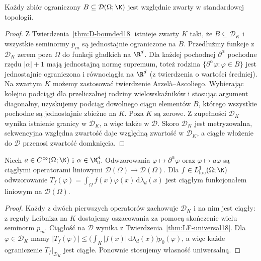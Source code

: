 \begin{twierdzenie}
\label{thm:D-Montel18}
Każdy zbiór ograniczony $B\subseteq\mathcal D(\Omega;\K)$
jest względnie zwarty w standardowej topologii.
\end{twierdzenie}
\begin{proof}
Z Twierdzenia~\ref{thm:D-bounded18} istnieje zwarty $K$
taki, że $B\subseteq\mathcal D_K$ i wszystkie seminormy
$p_m$ są jednostajnie ograniczone na $B$.
Przedłużmy funkcje z $\mathcal D_K$ zerem poza $\Omega$
do funkcji gładkich na $\R^d$. Dla każdej pochodnej
$\partial^\alpha$ pochodne rzędu $|\alpha|+1$ mają
jednostajną normę supremum, toteż rodzina
$\{\partial^\alpha\varphi:\varphi\in B\}$ jest
jednostajnie ograniczona i równociągła na $\R^d$
(z twierdzenia o wartości średniej). Na zwartym $K$
możemy zastosować twierdzenie Arzel\`a--Ascoliego.
Wybierając kolejno podciągi dla przeliczalnej rodziny
wielowskaźników i stosując argument diagonalny,
uzyskujemy podciąg dowolnego ciągu elementów $B$,
którego wszystkie pochodne są jednostajnie zbieżne na $K$.
Poza $K$ są zerowe. Z zupełności $\mathcal D_K$
wynika istnienie granicy w $\mathcal D_K$, a więc także
w $\mathcal D$. Skoro $\mathcal D_K$ jest metryzowalna,
sekwencyjna względna zwartość daje względną zwartość
w $\mathcal D_K$, a ciągłe włożenie do $\mathcal D$
przenosi zwartość domknięcia.
\end{proof}

\begin{stwierdzenie}
\label{prop:D-operators18}
Niech $a\in C^\infty(\Omega;\K)$ i
$\alpha\in\N_0^d$. Odwzorowania
$\varphi\mapsto\partial^\alpha\varphi$ oraz
$\varphi\mapsto a\varphi$ są ciągłymi operatorami
liniowymi $\mathcal D(\Omega)\to\mathcal D(\Omega)$.
Dla $f\in L^1_{\mathrm{loc}}(\Omega;\K)$ odwzorowanie
$T_f(\varphi)=\int_\Omega f(x)\varphi(x)\,\mathrm d\lambda_d(x)$
jest ciągłym funkcjonałem liniowym na $\mathcal D(\Omega)$.
\end{stwierdzenie}
\begin{proof}
Każdy z dwóch pierwszych operatorów zachowuje
$\mathcal D_K$ i na nim jest ciągły: z reguły Leibniza
na $K$ dostajemy oszacowania za pomocą skończenie
wielu seminorm $p_m$. Ciągłość na $\mathcal D$ wynika
z Twierdzenia~\ref{thm:LF-universal18}.
Dla $\varphi\in\mathcal D_K$ mamy
$|T_f(\varphi)|\le
\bigl(\int_K|f(x)|\,\mathrm d\lambda_d(x)\bigr)p_0(\varphi)$,
a więc każde ograniczenie $T_f|_{\mathcal D_K}$
jest ciągłe. Ponownie stosujemy własność uniwersalną.
\end{proof}

